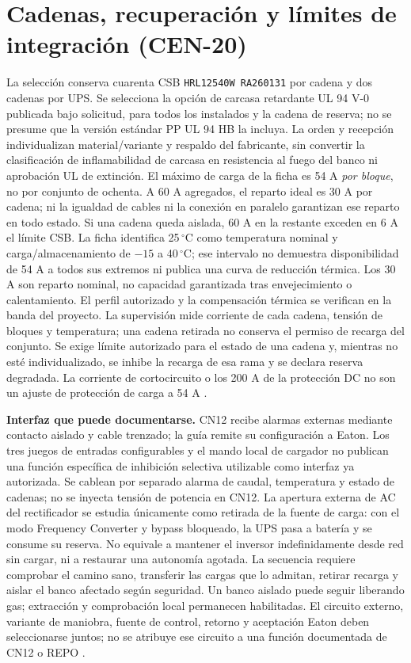\section{Cadenas, recuperación y límites de integración (CEN-20)}
\label{sec:sd4-cadenas-cen20}

La selección conserva cuarenta CSB \texttt{HRL12540W RA260131} por cadena y dos cadenas por UPS. Se selecciona la opción de carcasa retardante UL 94 V-0 publicada bajo solicitud, para todos los instalados y la cadena de reserva; no se presume que la versión estándar PP UL 94 HB la incluya. La orden y recepción individualizan material/variante y respaldo del fabricante, sin convertir la clasificación de inflamabilidad de carcasa en resistencia al fuego del banco ni aprobación UL de extinción. El máximo de carga de la ficha es 54 A \emph{por bloque}, no por conjunto de ochenta. A 60 A agregados, el reparto ideal es 30 A por cadena; ni la igualdad de cables ni la conexión en paralelo garantizan ese reparto en todo estado. Si una cadena queda aislada, 60 A en la restante exceden en 6 A el límite CSB. La ficha identifica 25\,$^{\circ}$C como temperatura nominal y carga/almacenamiento de $-15$ a 40\,$^{\circ}$C; ese intervalo no demuestra disponibilidad de 54 A a todos sus extremos ni publica una curva de reducción térmica. Los 30 A son reparto nominal, no capacidad garantizada tras envejecimiento o calentamiento. El perfil autorizado y la compensación térmica se verifican en la banda del proyecto. La supervisión mide corriente de cada cadena, tensión de bloques y temperatura; una cadena retirada no conserva el permiso de recarga del conjunto. Se exige límite autorizado para el estado de una cadena y, mientras no esté individualizado, se inhibe la recarga de esa rama y se declara reserva degradada. La corriente de cortocircuito o los 200 A de la protección DC no son un ajuste de protección de carga a 54 A \parencites[p.~1]{csbHRL12540WRA260131}[pp.~49--51 y 98]{p7-eaton-93t-guia}.

\textbf{Interfaz que puede documentarse.} CN12 recibe alarmas externas mediante contacto aislado y cable trenzado; la guía remite su configuración a Eaton. Los tres juegos de entradas configurables y el mando local de cargador no publican una función específica de inhibición selectiva utilizable como interfaz ya autorizada. Se cablean por separado alarma de caudal, temperatura y estado de cadenas; no se inyecta tensión de potencia en CN12. La apertura externa de AC del rectificador se estudia únicamente como retirada de la fuente de carga: con el modo Frequency Converter y bypass bloqueado, la UPS pasa a batería y se consume su reserva. No equivale a mantener el inversor indefinidamente desde red sin cargar, ni a restaurar una autonomía agotada. La secuencia requiere comprobar el camino sano, transferir las cargas que lo admitan, retirar recarga y aislar el banco afectado según seguridad. Un banco aislado puede seguir liberando gas; extracción y comprobación local permanecen habilitadas. El circuito externo, variante de maniobra, fuente de control, retorno y aceptación Eaton deben seleccionarse juntos; no se atribuye ese circuito a una función documentada de CN12 o REPO \parencites[secc.~5.4.2, 5.4.7, 5.5.2 y 6.2]{p7-eaton-93t-guia}{csbManualJunio2025}.

